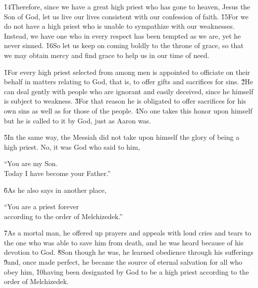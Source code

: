 \v{14}Therefore, since we have a great high priest who has gone to heaven, Jesus the Son of God, let us live our lives consistent with our confession of faith. \v{15}For we do not have a high priest who is unable to sympathize with our weaknesses. Instead, we have one who in every respect has been tempted as we are, yet he never sinned. \v{16}So let us keep on coming boldly to the throne of grace, so that we may obtain mercy and find grace to help us in our time of need.

\v{1}For every high priest selected from among men is appointed to officiate on their behalf in matters relating to God, that is, to offer gifts and sacrifices for sins. \v{2}He can deal gently with people who are ignorant and easily deceived, since he himself is subject to weakness. \v{3}For that reason he is obligated to offer sacrifices for his own sins as well as for those of the people. \v{4}No one takes this honor upon himself but he is called to it by God, just as Aaron was.

\v{5}In the same way, the Messiah did not take upon himself the glory of being a high priest. No, it was God who said to him,

\begin{poetry}
\poeml ``You are my Son. \\
\poemll    Today I have become your Father.''
\end{poetry}

\v{6}As he also says in another place,

\begin{poetry}
\poeml ``You are a priest forever \\
\poemll    according to the order of Melchizedek.''
\end{poetry}

\v{7}As a mortal man, he offered up prayers and appeals with loud cries and tears to the one who was able to save him from death, and he was heard because of his devotion to God. \v{8}Son though he was, he learned obedience through his sufferings \v{9}and, once made perfect, he became the source of eternal salvation for all who obey him, \v{10}having been designated by God to be a high priest according to the order of Melchizedek.

